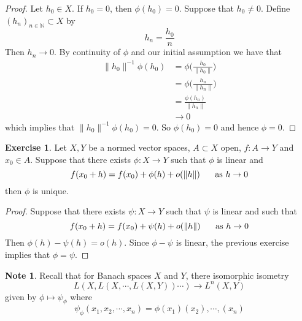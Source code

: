 \documentclass[12pt]{amsart}
\theoremstyle{definition}
\newtheorem{note}[definition]{Note}
\newtheorem{ex}[definition]{Exercise}
\newcommand{\N}{\mathbb{N}}
\begin{document}
	\begin{proof}
	Let $h_0 \in X$. If $h_0 = 0$, then $\phi(h_0) = 0$. Suppose that $h_0 \neq 0$. Define $(h_n)_{n \in \N} \subset X$ by $$h_n = \frac{h_0}{n}$$ Then $h_n \rightarrow 0$. By continuity of $\phi$ and our initial assumption we have that 
	\begin{align*}
	\| h_0 \|^{-1} \phi ( h_0 ) 
	&= \phi \bigg( \frac{h_0}{\| h_0 \|} \bigg) \\
	&= \phi \bigg( \frac{h_n}{\| h_n \|} \bigg) \\
	&= \frac{\phi(h_n)}{\| h_n \|} \\
	& \rightarrow 0
	\end{align*}
	which implies that $\| h_0 \|^{-1}\phi ( h_0 ) = 0$. So $\phi(h_0) = 0$ and hence $\phi = 0$.
	\end{proof}
	
	\begin{ex}
	Let $X, Y$ be a normed vector spaces, $A \subset X$ open, $f:A \rightarrow Y$ and $x_0 \in A$. Suppose that there exists $\phi: X \rightarrow Y$ such that $\phi$ is linear and $$f(x_0 + h) = f(x_0) + \phi(h) + o(\|h\| ) \hspace{.5cm} \text{ as } h \rightarrow 0$$ then $\phi$ is unique. 
	\end{ex}
	
	\begin{proof}
	Suppose that there exists $\psi : X \rightarrow Y$ such that $\psi$ is linear and such that
	$$f(x_0 + h) = f(x_0) + \psi(h) + o(\|h\| ) \hspace{.5cm} \text{ as } h \rightarrow 0$$ 
	Then $\phi(h) - \psi(h) = o(h)$. Since $\phi - \psi$ is linear, the previous exercise implies that $\phi = \psi$.
	\end{proof}
	
	\begin{note}
	Recall that for Banach spaces $X$ and $Y$, there isomorphic isometry $$L(X, L(X, \cdots, L(X, Y)) \cdots) \rightarrow L^n(X, Y)$$ given by $\phi \mapsto \psi_{\phi}$ where $$\psi_{\phi}(x_1, x_2, \cdots, x_n) = \phi(x_1)(x_2),\cdots,(x_n)$$
	\end{note}	
	
\end{document}
